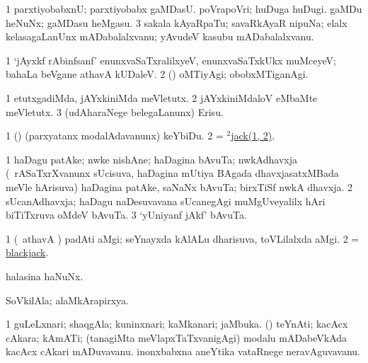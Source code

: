 \noindent
\gl{\pagu}
\bmng
\bnum
\num{1}  parxtiyobabxnU; parxtiyobabx gaMDasU. 
  
\banum
{} poVrapoVri; huDuga huDugi. 
 gaMDu heNuNx; gaMDasu heMgasu. 
\eanum
\numie
\num{3}  sakala kAyaRpaTu; savaRkAyaR nipuNa; elalx kelasagaLanUnx mADabalalxvanu; yAvudeV kasubu mADabalalxvanu. 
\enum
\emng

\noindent
\gl{\nuga}
\bmng
\bnum
\num{1}  `jAyxkf rAbinfsanf' enunxvaSaTxralilxyeV, enunxvaSaTxkUkx muMceyeV; bahaLa beVgane athavA kUDaleV. 
\num{2}  (\ashi) oMTiyAgi; obobxMTiganAgi. 
\enum
\emng
\eentry

\bentry
{}
\gl{\sakirx}
\bmng
\bnum
\num{1} etutxgadiMda, jAYxkiniMda meVletutx. 
\num{2} jAYxkiniMdaloV eMbaMte meVletutx. 
\num{3} (udAharaNege belegaLanunx) Erisu. 
\enum
\emng

\noindent
\gl{\pagu}
\bmng
\bnum
\num{1}   (\ashi) (parxyatanx modalAdavanunx) keYbiDu. 
\num{2}  = \hyperlink{jack(2)}{$^2$jack(1, 2)}. 
\enum
\emng
\eentry

\bentry
{}
\gl{\nA}
\bmng
\bnum
\num{1} haDagu patAke; nwke nishAne; haDagina bAvuTa; nwkAdhavxja (\kanmu\ rASaTxrXvanunx sUcisuva, haDagina mUtiya BAgada dhavxjasatxMBada meVle hArisuva) haDagina patAke, saNaNx bAvuTa;  birxTiSf nwkA dhavxja. 
\num{2} sUcanAdhavxja; haDagu naDesuvavana sUcanegAgi muMgUveyalilx hAri biTiTxruva oMdeV bAvuTa. 
\num{3} `yUniyanf jAkf' bAvuTa. 
\enum
\emng
\eentry

\bentry
{}
\gl{\nA}
\bmng
\bnum
\num{1} (\pArxparx\ athavA \ca) padAti aMgi; seYnayxda kAlALu dharisuva, toVLilalxda aMgi. 
\num{2} = \hyperref{kandict_b.pdf}{B}{blackjack}{blackjack}. 
\enum
\emng
\eentry

\bentry
{}
\gl{\nA}
\bmng
halasina haNuNx. 
\emng
\eentry

\bentry
{}
\gl{\nA}
\bmng
SoVkilAla; alaMkArapirxya. 
\emng
\eentry

\bentry
{}
\gl{\nA}
\bmng
\bnum
\num{1} guLeLxnari; shaqgAla; kuninxnari; kaMkanari; jaMbuka.   
 (\rUpa) teYnAti; 
\banum
{} kacAcx cAkara; kAmATi; (tanagiMta meVlapxTaTxvanigAgi) modalu mADabeVkAda kacAcx cAkari mADuvavanu. 
 inonxbabxna aneYtika vataRnege neravAguvavanu. 
\eanum
\numie
\enum
\emng
\eentry

